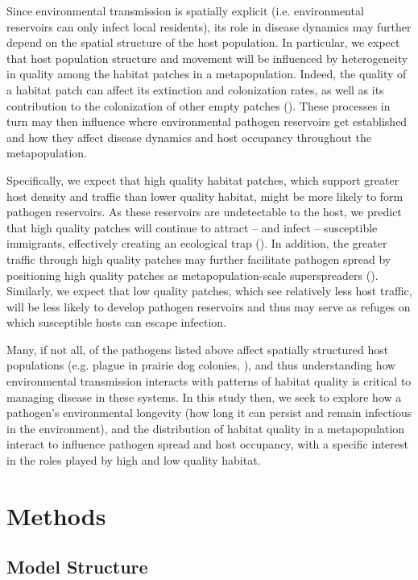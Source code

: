 \documentclass{article}
\begin{document}
Since environmental transmission is spatially explicit (i.e. environmental reservoirs can only infect local residents), its role in disease dynamics may further depend on the spatial structure of the host population.  In particular, we expect that host population structure and movement will be influenced by heterogeneity in quality among the habitat patches in a metapopulation.  Indeed, the quality of a habitat patch can affect its extinction and colonization rates, as well as its contribution to the colonization of other empty patches (\cite{Moilanen1998}).  These processes in turn may then influence where environmental pathogen reservoirs get established and how they affect disease dynamics and host occupancy throughout the metapopulation.  

Specifically, we expect that high quality habitat patches, which support greater host density and traffic than lower quality habitat, might be more likely to form pathogen reservoirs.  As these reservoirs are undetectable to the host, we predict that high quality patches will continue to attract -- and infect -- susceptible immigrants, effectively creating an ecological trap (\cite{Almberg2011}).  In addition, the greater traffic through high quality patches may further facilitate pathogen spread by positioning high quality patches as metapopulation-scale superspreaders (\cite{Paull2012}).  Similarly, we expect that low quality patches, which see relatively less host traffic, will be less likely to develop pathogen reservoirs and thus may serve as refuges on which susceptible hosts can escape infection.  

Many, if not all, of the pathogens listed above affect spatially structured host populations (e.g. plague in prairie dog colonies, \cite{George2013}), and thus understanding how environmental transmission interacts with patterns of habitat quality is critical to managing disease in these systems.  In this study then, we seek to explore how a pathogen's environmental longevity (how long it can persist and remain infectious in the environment), and the distribution of habitat quality in a metapopulation interact to influence pathogen spread and host occupancy, with a specific interest in the roles played by high and low quality habitat.  

\section{Methods}
\label{methods}

\subsection{Model Structure}
\end{document}
